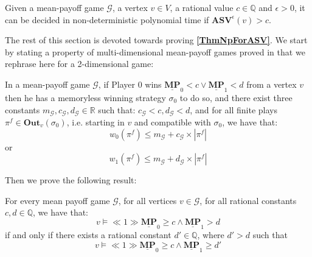 \begin{theorem}
\label{ThmNpForASV}
Given a mean-payoff game $\mathcal{G}$, a vertex $v \in V$, a rational value $c \in \mathbb{Q}$ and $\epsilon > 0$, it can be decided in non-deterministic polynomial time if $\mathbf{ASV}^{\epsilon}(v) > c$.
\end{theorem}

\noindent The rest of this section is devoted towards proving \textbf{\cref{ThmNpForASV}}. We start by stating a property of multi-dimensional mean-payoff games proved in \cite{VCDHRR15} that we rephrase here for a 2-dimensional game:

\begin{lemma}
    \label{LemWeightPlayGrtThanC}
    In a mean-payoff game $\mathcal{G}$, if Player 0 wins $\underline{\mathbf{MP}}_0 < c \lor \underline{\mathbf{MP}}_1 < d$ from a vertex $v$ then he has a memoryless winning strategy $\sigma_0$ to do so, and there exist three constants $m_\mathcal{G}, c_\mathcal{G}, d_\mathcal{G} \in \mathbb{R}$ such that: $c_\mathcal{G} < c, d_\mathcal{G} < d$, and for all finite plays $\pi^f \in \mathbf{Out}_v(\sigma_0)$, i.e. starting in $v$ and compatible with $\sigma_0$, we have that:
    \begin{equation*}
        w_0(\pi^f) \leqslant m_\mathcal{G} + c_\mathcal{G} \times |\pi^f|
    \end{equation*}
    or
    \begin{equation*}
        w_1(\pi^f) \leqslant m_\mathcal{G} + d_\mathcal{G} \times |\pi^f|
    \end{equation*}
\end{lemma}

\noindent Then we prove the following result:

\begin{lemma}
    \label{ConjGrtIsGrtEq}
    For every mean payoff game $\mathcal{G}$, for all vertices $v \in \mathcal{G}$, for all rational constants $c, d \in \mathbb{Q}$, we have that:
    \begin{equation*}
        v \models \ll 1 \gg \underline{\mathbf{MP}}_0 \geqslant c \land \underline{\mathbf{MP}}_1 > d
    \end{equation*}
    if and only if there exists a rational constant $d' \in \mathbb{Q}$, where $d' > d$ such that
    \begin{equation*}
        v \models \ll 1 \gg \underline{\mathbf{MP}}_0 \geqslant c \land \underline{\mathbf{MP}}_1 \geqslant d'
    \end{equation*}
\end{lemma}

